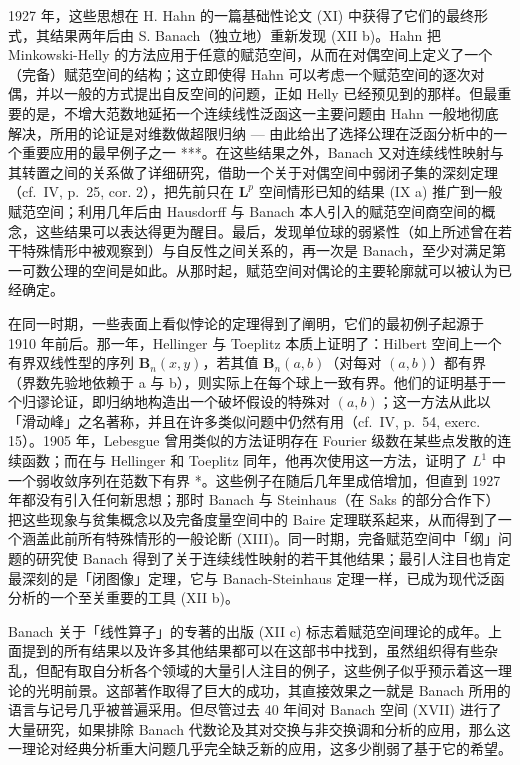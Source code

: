 1927 年，这些思想在 H. Hahn 的一篇基础性论文 (XI) 中获得了它们的最终形式，其结果两年后由 S. Banach（独立地）重新发现 (XII b)。Hahn 把 Minkowski-Helly 的方法应用于任意的赋范空间，从而在对偶空间上定义了一个（完备）赋范空间的结构；这立即使得 Hahn 可以考虑一个赋范空间的逐次对偶，并以一般的方式提出自反空间的问题，正如 Helly 已经预见到的那样。但最重要的是，不增大范数地延拓一个连续线性泛函这一主要问题由 Hahn 一般地彻底解决，所用的论证是对维数做超限归纳 --- 由此给出了选择公理在泛函分析中的一个重要应用的最早例子之一 ***。在这些结果之外，Banach 又对连续线性映射与其转置之间的关系做了详细研究，借助一个关于对偶空间中弱闭子集的深刻定理（cf.~IV, p.~25, cor. 2），把先前只在 \(\mathbf{L}^p\) 空间情形已知的结果 (IX a) 推广到一般赋范空间；利用几年后由 Hausdorff 与 Banach 本人引入的赋范空间商空间的概念，这些结果可以表达得更为醒目。最后，发现单位球的弱紧性（如上所述曾在若干特殊情形中被观察到）与自反性之间关系的，再一次是 Banach，至少对满足第一可数公理的空间是如此。从那时起，赋范空间对偶论的主要轮廓就可以被认为已经确定。

在同一时期，一些表面上看似悖论的定理得到了阐明，它们的最初例子起源于 1910 年前后。那一年，Hellinger 与 Toeplitz 本质上证明了：Hilbert 空间上一个有界双线性型的序列 \(\mathbf{B}_{n}(x,y)\)，若其值 \(\mathbf{B}_{n}(a,b)\)（对每对 \((a,b)\)）都有界（界数先验地依赖于 a 与 b），则实际上在每个球上一致有界。他们的证明基于一个归谬论证，即归纳地构造出一个破坏假设的特殊对 \((a,b)\)；这一方法从此以「滑动峰」之名著称，并且在许多类似问题中仍然有用（cf.~IV, p.~54, exerc. 15）。1905 年，Lebesgue 曾用类似的方法证明存在 Fourier 级数在某些点发散的连续函数；而在与 Hellinger 和 Toeplitz 同年，他再次使用这一方法，证明了 \(L^{1}\) 中一个弱收敛序列在范数下有界 *。这些例子在随后几年里成倍增加，但直到 1927 年都没有引入任何新思想；那时 Banach 与 Steinhaus（在 Saks 的部分合作下）把这些现象与贫集概念以及完备度量空间中的 Baire 定理联系起来，从而得到了一个涵盖此前所有特殊情形的一般论断 (XIII)。同一时期，完备赋范空间中「纲」问题的研究使 Banach 得到了关于连续线性映射的若干其他结果；最引人注目也肯定最深刻的是「闭图像」定理，它与 Banach-Steinhaus 定理一样，已成为现代泛函分析的一个至关重要的工具 (XII b)。

Banach 关于「线性算子」的专著的出版 (XII c) 标志着赋范空间理论的成年。上面提到的所有结果以及许多其他结果都可以在这部书中找到，虽然组织得有些杂乱，但配有取自分析各个领域的大量引人注目的例子，这些例子似乎预示着这一理论的光明前景。这部著作取得了巨大的成功，其直接效果之一就是 Banach 所用的语言与记号几乎被普遍采用。但尽管过去 40 年间对 Banach 空间 (XVII) 进行了大量研究，如果排除 Banach 代数论及其对交换与非交换调和分析的应用，那么这一理论对经典分析重大问题几乎完全缺乏新的应用，这多少削弱了基于它的希望。

